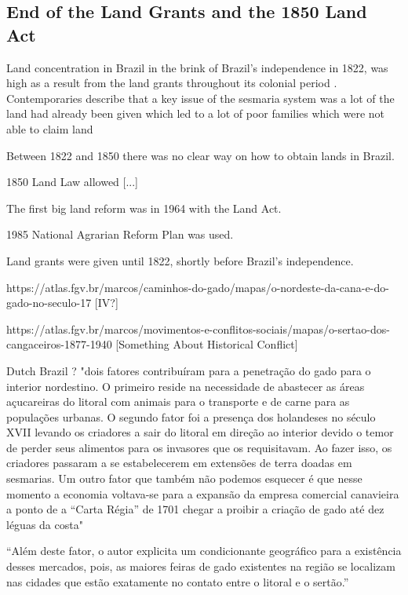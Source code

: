 \documentclass{article}
\begin{document}
\subsection{End of the Land Grants and the 1850 Land Act}

Land concentration in Brazil in the brink of Brazil's independence in 1822, was high as a result from the land grants throughout its colonial period \parencite{Smith1972-dv}.
Contemporaries describe that a key issue of the sesmaria system was a lot of the land had already been given which led to a lot of poor families which were not able to claim land \parencite[p.~42-43]{Lima1954-td}



Between 1822 and 1850 there was no clear way on how to obtain lands in Brazil. 

1850 Land Law allowed [...]

The first big land reform was in 1964 with the Land Act.

1985 National Agrarian Reform Plan was used.

Land grants were given until 1822, shortly before Brazil's independence.

https://atlas.fgv.br/marcos/caminhos-do-gado/mapas/o-nordeste-da-cana-e-do-gado-no-seculo-17 [IV?]

https://atlas.fgv.br/marcos/movimentos-e-conflitos-sociais/mapas/o-sertao-dos-cangaceiros-1877-1940 [Something About Historical Conflict]

Dutch Brazil ? "dois fatores contribuíram para a penetração do gado para o interior nordestino. O primeiro reside na necessidade de abastecer as áreas açucareiras do litoral com animais para o transporte e de carne para as populações urbanas. O segundo fator foi a presença dos holandeses no século XVII levando os criadores a sair do litoral em direção ao interior devido o temor de perder seus alimentos para os invasores que os requisitavam. Ao fazer isso, os criadores passaram a se estabelecerem em extensões de terra doadas em sesmarias. Um outro fator que também não podemos esquecer é que nesse momento a economia voltava-se para a expansão da empresa comercial canavieira a ponto de a “Carta Régia” de 1701 chegar a proibir a criação de gado até dez léguas da costa" 

``Além deste fator, o autor explicita um condicionante geográfico para a existência desses mercados, pois, as maiores feiras de gado existentes na região se localizam nas cidades que estão exatamente no contato entre o litoral e o sertão.'' \parencite{Galdino_Dantas2008-pw}
\end{document}
